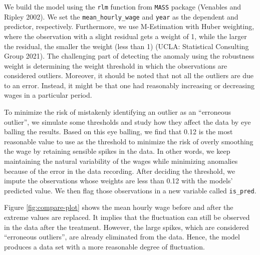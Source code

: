 \documentclass{article}
\begin{document}
We build the model using the \texttt{rlm} function from \texttt{MASS} package (Venables and Ripley 2002). We set the \texttt{mean\_hourly\_wage} and \texttt{year} as the dependent and predictor, respectively. Furthermore, we use M-Estimation with Huber weighting, where the observation with a slight residual gets a weight of 1, while the larger the residual, the smaller the weight (less than 1) (UCLA: Statistical Consulting Group 2021). The challenging part of detecting the anomaly using the robustness weight is determining the weight threshold in which the observations are considered outliers. Moreover, it should be noted that not all the outliers are due to an error. Instead, it might be that one had reasonably increasing or decreasing wages in a particular period.

To minimize the risk of mistakenly identifying an outlier as an ``erroneous outlier'', we simulate some thresholds and study how they affect the data by eye balling the results. Based on this eye balling, we find that 0.12 is the most reasonable value to use as the threshold to minimize the risk of overly smoothing the wage by retaining sensible spikes in the data. In other words, we keep maintaining the natural variability of the wages while minimizing anomalies because of the error in the data recording. After deciding the threshold, we impute the observations whose weights are less than 0.12 with the models' predicted value. We then flag those observations in a new variable called \texttt{is\_pred}.

Figure \ref{fig:compare-plot} shows the mean hourly wage before and after the extreme values are replaced. It implies that the fluctuation can still be observed in the data after the treatment. However, the large spikes, which are considered ``erroneous outliers'', are already eliminated from the data. Hence, the model produces a data set with a more reasonable degree of fluctuation.
\end{document}
